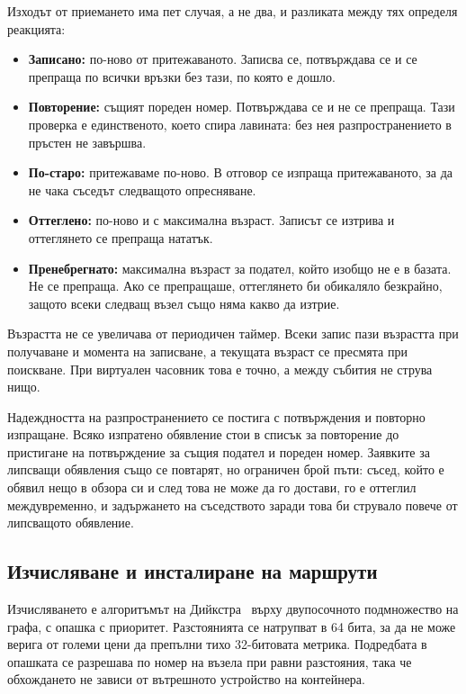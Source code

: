 Изходът от приемането има пет случая, а не два, и разликата между тях определя реакцията:

\begin{itemize}[topsep=0pt,itemsep=0pt,leftmargin=*]
\item \textbf{Записано:} по-ново от притежаваното. Записва се, потвърждава се и се
      препраща по всички връзки без тази, по която е дошло.
\item \textbf{Повторение:} същият пореден номер. Потвърждава се и не се препраща. Тази
      проверка е единственото, което спира лавината: без нея разпространението в пръстен
      не завършва.
\item \textbf{По-старо:} притежаваме по-ново. В отговор се изпраща притежаваното, за да
      не чака съседът следващото опресняване.
\item \textbf{Оттеглено:} по-ново и с максимална възраст. Записът се изтрива и оттеглянето
      се препраща нататък.
\item \textbf{Пренебрегнато:} максимална възраст за подател, който изобщо не е в базата.
      Не се препраща. Ако се препращаше, оттеглянето би обикаляло безкрайно, защото
      всеки следващ възел също няма какво да изтрие.
\end{itemize}

Възрастта не се увеличава от периодичен таймер. Всеки запис пази възрастта при получаване
и момента на записване, а текущата възраст се пресмята при поискване. При виртуален
часовник това е точно, а между събития не струва нищо.

Надеждността на разпространението се постига с потвърждения и повторно изпращане. Всяко
изпратено обявление стои в списък за повторение до пристигане на потвърждение за същия
подател и пореден номер. Заявките за липсващи обявления също се повтарят, но ограничен
брой пъти: съсед, който е обявил нещо в обзора си и след това не може да го достави, го
е оттеглил междувременно, и задържането на съседството заради това би струвало повече от
липсващото обявление.

\subsection{Изчисляване и инсталиране на маршрути}

Изчисляването е алгоритъмът на Дийкстра~\cite{dijkstra1959} върху двупосочното подмножество
на графа, с опашка с приоритет. Разстоянията се натрупват в 64 бита, за да не може верига
от големи цени да препълни тихо 32-битовата метрика. Подредбата в опашката се разрешава по
номер на възела при равни разстояния, така че обхождането не зависи от вътрешното
устройство на контейнера.

